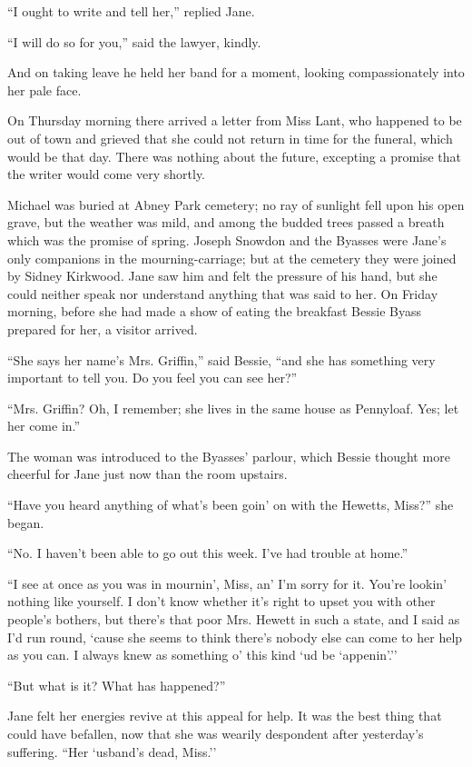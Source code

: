 ``I ought to write and tell her,'' replied Jane.

``I will do so for you,'' said the lawyer, kindly.

And on taking leave he held her band for a moment, looking
compassionately into her pale face.

On Thursday morning there arrived a letter from Miss Lant, who happened
to be out of town and grieved that she could not return in time for the
funeral, which would be that day. There was nothing about the future,
excepting a promise that the writer would come very shortly.

Michael was buried at Abney Park {}cemetery; no ray of sunlight fell
upon his open grave, but the weather was mild, and among the budded
trees passed a breath which was the promise of spring. Joseph Snowdon
and the Byasses were Jane's only companions in the mourning-carriage;
but at the cemetery they were joined by Sidney Kirkwood. Jane saw him
and felt the pressure of his hand, but she could neither speak nor
understand anything that was said to her. On Friday morning, before she
had made a show of eating the breakfast Bessie Byass prepared for her, a
visitor arrived.

``She says her name's Mrs. Griffin,'' said Bessie, ``and she has
something very important to tell you. Do you feel you can see her?''

``Mrs. Griffin? Oh, I remember; she lives in the same house as
Pennyloaf. Yes; let her come in.''

The woman was introduced to the Byasses' parlour, which Bessie thought
more cheerful for Jane just now than the room upstairs.

``Have you heard anything of what's been goin' on with the Hewetts,
Miss?'' she began.

``No. I haven't been able to go out this week. I've had trouble at
home.''

{}``I see at once as you was in mournin', Miss, an' I'm sorry for it.
You're lookin' nothing like yourself. I don't know whether it's right to
upset you with other people's bothers, but there's that poor Mrs. Hewett
in such a state, and I said as I'd run round, `cause she seems to think
there's nobody else can come to her help as you can. I always knew as
something o' this kind `ud be `appenin'.''

``But what is it? What has happened?''

Jane felt her energies revive at this appeal for help. It was the best
thing that could have befallen, now that she was wearily despondent
after yesterday's suffering. ``Her `usband's dead, Miss.''

